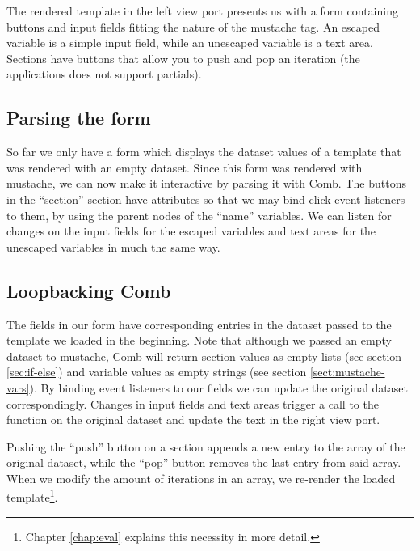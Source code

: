 \documentclass[thesis.tex]{subfiles}
\begin{document}
The rendered template in the left view port presents us with a form containing
buttons and input fields fitting the nature of the mustache tag.
An escaped variable is a simple input field,
while an unescaped variable is a text area.
Sections have buttons that allow you to push and pop an iteration
(the applications does not support partials).

\subsection{Parsing the form}

So far we only have a form which displays the dataset values of a template that
was rendered with an empty dataset.
Since this form was rendered with mustache, we can now make it interactive by
parsing it with Comb. The buttons in the ``section'' section have
 attributes so that we may bind click event listeners to
them, by using the parent nodes of the ``name'' variables. We can listen
for changes on the input fields for the escaped variables and text areas for the
unescaped variables in much the same way.

\subsection{Loopbacking Comb}

The fields in our form have corresponding entries in the dataset passed to
the template we loaded in the beginning.
Note that although we passed an empty dataset to mustache, Comb will return
section values as empty lists (see section \ref{sec:if-else}) and
variable values as empty strings (see section \ref{sect:mustache-vars}).
By binding event listeners to our fields we can update the original dataset
correspondingly. Changes in input fields and text areas trigger a call to the
 function on the original dataset and update the text in the
right view port.

Pushing the ``push'' button on a section appends a new entry to the array of the
original dataset, while the ``pop'' button removes the last entry from said array.
When we modify the amount of iterations in an array, we re-render the loaded
template\footnote{
	Chapter \ref{chap:eval} explains this necessity in more detail.
}.
\end{document}
